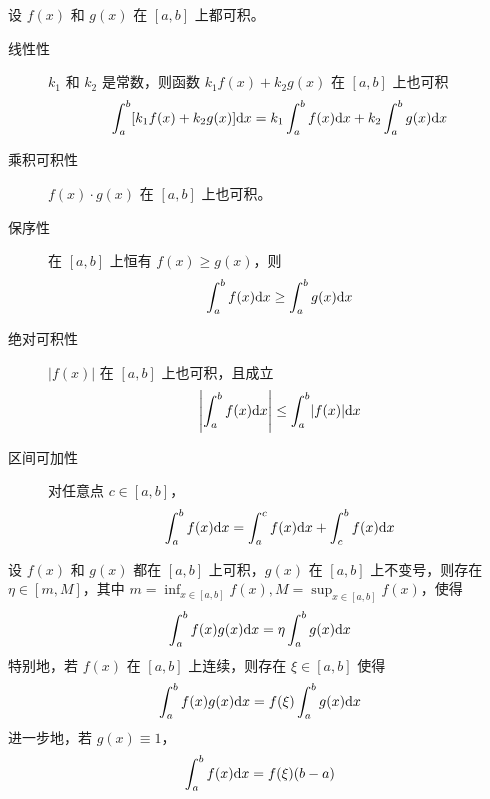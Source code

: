 \documentclass{ctexbook}
\def\diff{\textnormal{d}}
\begin{document}
\begin{proposition}[定积分的性质]
    设 $f(x)$ 和 $g(x)$ 在 $[a,b]$ 上都可积。
    \begin{description}
        \item[线性性] $k_1$ 和 $k_2$ 是常数，则函数 $k_1f(x)+k_2g(x)$ 在 $[a,b]$ 上也可积
        \begin{equation}
            \int_a^b [k_1f(x)+k_2g(x)]\diff x=k_1\int_a^b f(x)\diff x+k_2\int_a^b g(x)\diff x
        \end{equation}
        
        \item[乘积可积性] $f(x)\cdot g(x)$ 在 $[a,b]$ 上也可积。
        \item[保序性] 在 $[a,b]$ 上恒有 $f(x)\geq g(x)$，则
        \begin{equation}
            \int_a^b f(x)\diff x\geq \int_a^b g(x)\diff x
        \end{equation}
        \item[绝对可积性] $|f(x)|$ 在 $[a,b]$ 上也可积，且成立
        \begin{equation}
            \left\vert\int_a^b f(x)\diff x\right\vert\leq\int_a^b\lvert f(x)\rvert\diff x
        \end{equation}
        \item[区间可加性] 对任意点 $c\in[a,b]$，
        \begin{equation}
            \int_a^b f(x)\diff x=\int_a^c f(x)\diff x+\int_c^b f(x)\diff x
        \end{equation}
    \end{description}
\end{proposition}

\begin{theorem}[积分第一中值定理]
    设 $f(x)$ 和 $g(x)$ 都在 $[a,b]$ 上可积，$g(x)$ 在 $[a,b]$ 上不变号，则存在 $\eta\in[m,M]$，其中 $m=\inf_{x\in[a,b]} f(x),M=\sup_{x\in[a,b]} f(x)$，使得
    \begin{equation}
        \int_a^b f(x)g(x)\diff x=\eta\int_a^b g(x)\diff x
    \end{equation}
    特别地，若 $f(x)$ 在 $[a,b]$ 上连续，则存在 $\xi\in[a,b]$ 使得
    \begin{equation}
        \int_a^b f(x)g(x)\diff x=f(\xi)\int_a^b g(x)\diff x
    \end{equation}
    进一步地，若 $g(x)\equiv 1$，
    \begin{equation}
        \int_a^b f(x)\diff x=f(\xi)(b-a)
    \end{equation}
\end{theorem}
\end{document}
